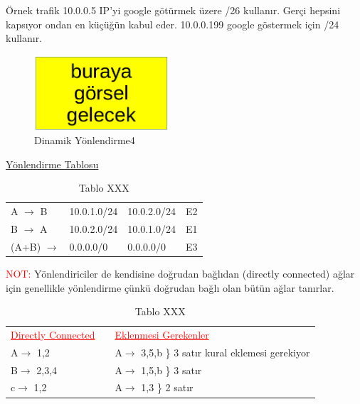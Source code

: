 Örnek trafik 10.0.0.5 IP'yi google götürmek üzere /26 kullanır. Gerçi hepsini kapsıyor ondan en küçüğün kabul eder. 10.0.0.199 google göstermek için /24 kullanır.

\begin{figure}[ht]
    \centering
    \includegraphics[width=5cm]{images/BurayaGorselGelecek.png}
    \caption{Dinamik Yönlendirme4}
    \label{fig:DinamikYonlendirme4}
\end{figure}

\begin{center}
 \underline{Yönlendirme Tablosu}
\end{center}

\begin{table}[ht]
   \centering  
   \begin{tabular}{llll}
   A $\rightarrow$ B & 10.0.1.0/24 & 10.0.2.0/24 & E2\\
   B $\rightarrow$ A & 10.0.2.0/24 & 10.0.1.0/24 & E1\\
   (A+B)    $\rightarrow$  & 0.0.0.0/0 & 0.0.0.0/0 & E3
  \end{tabular}
  \caption{Tablo XXX}    
\end{table}

\textcolor{red}{NOT: } Yönlendiriciler de kendisine doğrudan bağlıdan (directly connected) ağlar için genellikle yönlendirme  çünkü doğrudan bağlı olan bütün ağlar tanırlar.

\begin{table}[ht]
   \centering
   \begin{tabular}{lll}
   \textcolor{red}{\underline{Directly Connected}}&   
   & \textcolor{red}{\underline{Eklenmesi Gerekenler}}\\
   A$\rightarrow$ 1,2 && A$\rightarrow$ 3,5,b \} 3 satır kural eklemesi gerekiyor\\
   B$\rightarrow$ 2,3,4 && A$\rightarrow$ 1,5,b \} 3 satır\\
   c$\rightarrow$ 1,2 &&A$\rightarrow$ 1,3 \} 2 satır \\
  \end{tabular}
  \caption{Tablo XXX}    
\end{table}

